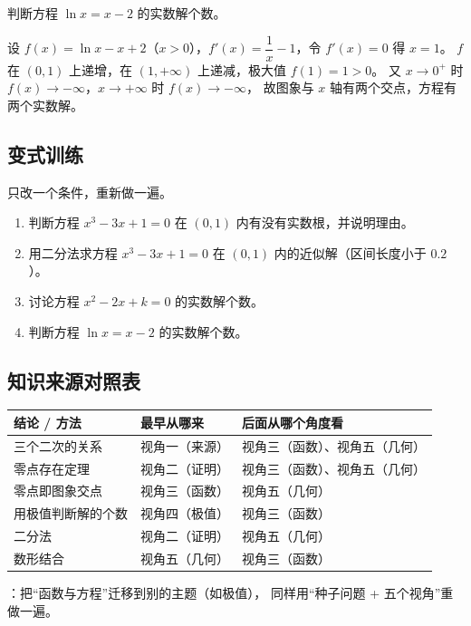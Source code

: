 \begin{explore}
\begin{problem}
判断方程 $\ln x=x-2$ 的实数解个数。
\end{problem}
\begin{solution}
设 $f(x)=\ln x-x+2$（$x>0$），$f'(x)=\dfrac1x-1$，令 $f'(x)=0$ 得 $x=1$。
$f$ 在 $(0,1)$ 上递增，在 $(1,+\infty)$ 上递减，极大值 $f(1)=1>0$。
又 $x\to0^+$ 时 $f(x)\to-\infty$，$x\to+\infty$ 时 $f(x)\to-\infty$，
故图象与 $x$ 轴有两个交点，方程有两个实数解。
\end{solution}
\end{explore}

\begin{inclasstest}
\subsection{变式训练}
只改一个条件，重新做一遍。
\begin{enumerate}
  \item 判断方程 $x^3-3x+1=0$ 在 $(0,1)$ 内有没有实数根，并说明理由。
  \item 用二分法求方程 $x^3-3x+1=0$ 在 $(0,1)$ 内的近似解（区间长度小于 $0.2$）。
  \item 讨论方程 $x^2-2x+k=0$ 的实数解个数。
  \item 判断方程 $\ln x=x-2$ 的实数解个数。
\end{enumerate}
\end{inclasstest}

\begin{afterclass}
\subsection{知识来源对照表}
\begin{center}
\footnotesize
\setlength{\tabcolsep}{4pt}
\renewcommand{\arraystretch}{1.35}
\begin{tabular}{p{3.4cm}p{4.0cm}p{5.6cm}}
\toprule
结论 / 方法 & 最早从哪来 & 后面从哪个角度看 \\
\midrule
三个二次的关系 & 视角一（来源） & 视角三（函数）、视角五（几何） \\
零点存在定理 & 视角二（证明） & 视角三（函数）、视角五（几何） \\
零点即图象交点 & 视角三（函数） & 视角五（几何） \\
用极值判断解的个数 & 视角四（极值） & 视角三（函数） \\
二分法 & 视角二（证明） & 视角五（几何） \\
数形结合 & 视角五（几何） & 视角三（函数） \\
\bottomrule
\end{tabular}
\end{center}

：把“函数与方程”迁移到别的主题（如极值），
同样用“种子问题 + 五个视角”重做一遍。
\end{afterclass}
